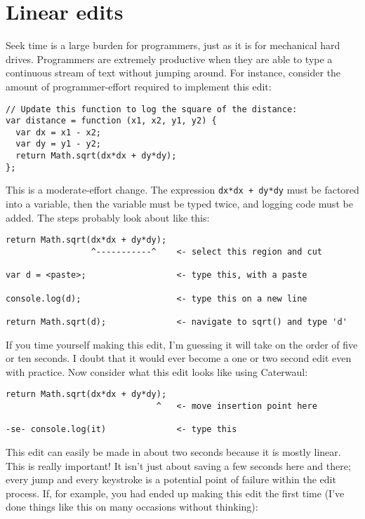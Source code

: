 \documentclass{report}
\begin{document}
\section{Linear edits}
    Seek time is a large burden for programmers, just as it is for mechanical hard drives. Programmers are extremely productive when they are able to type a continuous stream of text without
    jumping around. For instance, consider the amount of programmer-effort required to implement this edit:

\begin{verbatim}
// Update this function to log the square of the distance:
var distance = function (x1, x2, y1, y2) {
  var dx = x1 - x2;
  var dy = y1 - y2;
  return Math.sqrt(dx*dx + dy*dy);
};
\end{verbatim}

    This is a moderate-effort change. The expression {\tt dx*dx + dy*dy} must be factored into a variable, then the variable must be typed twice, and logging code must be added. The steps
    probably look about like this:

\begin{verbatim}
return Math.sqrt(dx*dx + dy*dy);
                 ^-----------^    <- select this region and cut

var d = <paste>;                  <- type this, with a paste

console.log(d);                   <- type this on a new line

return Math.sqrt(d);              <- navigate to sqrt() and type 'd'
\end{verbatim}

    If you time yourself making this edit, I'm guessing it will take on the order of five or ten seconds. I doubt that it would ever become a one or two second edit even with practice. Now
    consider what this edit looks like using Caterwaul:

\begin{verbatim}
return Math.sqrt(dx*dx + dy*dy);
                              ^   <- move insertion point here

-se- console.log(it)              <- type this
\end{verbatim}

    This edit can easily be made in about two seconds because it is mostly linear. This is really important! It isn't just about saving a few seconds here and there; every jump and every
    keystroke is a potential point of failure within the edit process. If, for example, you had ended up making this edit the first time (I've done things like this on many occasions without
    thinking):
\end{document}
